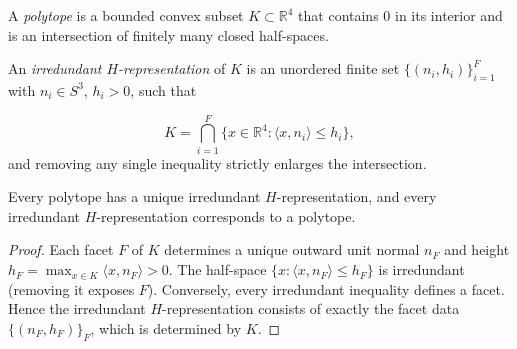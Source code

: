 
\begin{definition}[Polytope]\label{def:polytope}
A \emph{polytope} is a bounded convex subset
$K \subset \mathbb{R}^4$ that contains $0$ in its interior and is an
intersection of finitely many closed half-spaces.

\begin{sloppypar}
An \emph{irredundant $H$-representation} of $K$ is an unordered
finite set $\{(n_i, h_i)\}_{i=1}^{F}$ with $n_i \in S^3$,
$h_i > 0$, such that
\end{sloppypar}
\[
  K = \bigcap_{i=1}^{F} \{ x \in \mathbb{R}^4 : \langle x, n_i \rangle \leq h_i \},
\]
and removing any single inequality strictly enlarges the intersection.
\end{definition}

\begin{lemma}\label{lem:h-rep-unique}
Every polytope has a unique irredundant $H$-representation,
and every irredundant $H$-representation corresponds to a polytope.
\end{lemma}

\begin{proof}
Each facet $F$ of $K$ determines a unique outward unit normal $n_F$
and height $h_F = \max_{x \in K} \langle x, n_F \rangle > 0$.
The half-space $\{x : \langle x, n_F \rangle \leq h_F\}$ is irredundant
(removing it exposes $F$).
Conversely, every irredundant inequality defines a facet.
Hence the irredundant $H$-representation consists of exactly the
facet data $\{(n_F, h_F)\}_F$, which is determined by $K$.
\end{proof}

